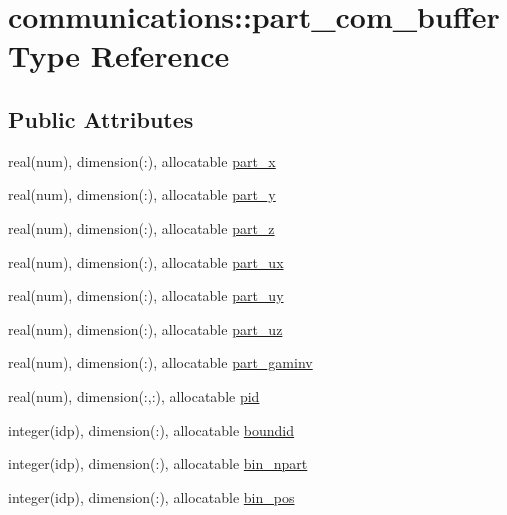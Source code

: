 \hypertarget{structcommunications_1_1part__com__buffer}{}\section{communications\+:\+:part\+\_\+com\+\_\+buffer Type Reference}
\label{structcommunications_1_1part__com__buffer}
\subsection*{Public Attributes}
\begin{DoxyCompactItemize}
\item 
real(num), dimension(\+:), allocatable \hyperlink{structcommunications_1_1part__com__buffer_a801190722c7c8ca2c90a9e743ea49df3}{part\+\_\+x}
\item 
real(num), dimension(\+:), allocatable \hyperlink{structcommunications_1_1part__com__buffer_a5cd819e9ef8a6538446d32965392d7f2}{part\+\_\+y}
\item 
real(num), dimension(\+:), allocatable \hyperlink{structcommunications_1_1part__com__buffer_aba5857af31512603eecebf3aa0203ea6}{part\+\_\+z}
\item 
real(num), dimension(\+:), allocatable \hyperlink{structcommunications_1_1part__com__buffer_af1c242d710cd0b6f6f1c25cbedafabcd}{part\+\_\+ux}
\item 
real(num), dimension(\+:), allocatable \hyperlink{structcommunications_1_1part__com__buffer_afc4b7b24aed0f639d2f5b74e12a888e3}{part\+\_\+uy}
\item 
real(num), dimension(\+:), allocatable \hyperlink{structcommunications_1_1part__com__buffer_a5be69147d4cd90331ef92ffa6f47b805}{part\+\_\+uz}
\item 
real(num), dimension(\+:), allocatable \hyperlink{structcommunications_1_1part__com__buffer_a39c8f22b90fd33cf630e18bcb85056e8}{part\+\_\+gaminv}
\item 
real(num), dimension(\+:,\+:), allocatable \hyperlink{structcommunications_1_1part__com__buffer_a3f80b3e7ff7b9921254b416d8f53a70c}{pid}
\item 
integer(idp), dimension(\+:), allocatable \hyperlink{structcommunications_1_1part__com__buffer_a53d02ebdef270bdb939753464a98308d}{boundid}
\item 
integer(idp), dimension(\+:), allocatable \hyperlink{structcommunications_1_1part__com__buffer_aa04bc026445b333736618f013ac9608d}{bin\+\_\+npart}
\item 
integer(idp), dimension(\+:), allocatable \hyperlink{structcommunications_1_1part__com__buffer_a19c1313a9e514c7c71eb54786b3020b6}{bin\+\_\+pos}
\end{DoxyCompactItemize}


